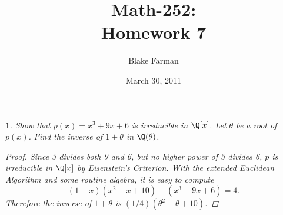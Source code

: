 \documentclass[10pt]{amsart}
\author{Blake Farman}
\title{Math-252:\\Homework 7}
\date{March 30, 2011}
\begin{document}
\maketitle

\newtheorem{thm}{}

\begin{thm}
  \label{Ex1}
  Show that $p(x) = x^3 + 9x + 6$ is irreducible in $\Q[x]$.
  Let $\theta$ be a root of $p(x)$.
  Find the inverse of $1 + \theta$ in $\Q(\theta)$.
  \begin{proof}
    Since 3 divides both 9 and 6, but no higher power of 3 divides 6, $p$ is irreducible in $\Q[x]$ by Eisenstein's Criterion.
    With the extended Euclidean Algorithm and some routine algebra, it is easy to compute
    $$(1+x)(x^2 - x + 10) - (x^3 + 9x + 6)  = 4.$$
    Therefore the inverse of $1 + \theta$ is $(1/4)(\theta^2 - \theta + 10)$.
  \end{proof}
\end{thm}
\end{document}
